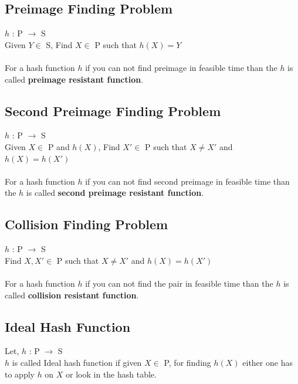 \documentclass[11pt]{article}
\begin{document}
\subsection*{Preimage Finding Problem}
$h$ : P $\rightarrow$ S \\
Given $Y \in$ S, Find $X \in$ P such that $h(X) = Y$ \\
\\
For a hash function $h$ if you can not find preimage in feasible time than the $h$ is called \textbf{preimage resistant function}.
\subsection*{Second Preimage Finding Problem}
$h$ : P $\rightarrow$ S \\
Given $X \in$ P and $h(X)$, Find $X' \in$ P such that $X \neq X'$ and $h(X) = h(X')$ \\
\\
For a hash function $h$ if you can not find second preimage in feasible time than the $h$ is called \textbf{second preimage resistant function}.
\subsection*{Collision Finding Problem}
$h$ : P $\rightarrow$ S \\
Find $X,X' \in$ P such that $X \neq X'$ and $h(X) = h(X')$ \\
\\
For a hash function $h$ if you can not find the pair in feasible time than the $h$ is called \textbf{collision resistant function}.
\subsection*{Ideal Hash Function}
Let, $h$ : P $\rightarrow$ S \\
$h$ is called Ideal hash function if given $X \in$ P, for finding $h(X)$ either one has to apply $h$ on $X$ or look in the hash table.
\end{document}

